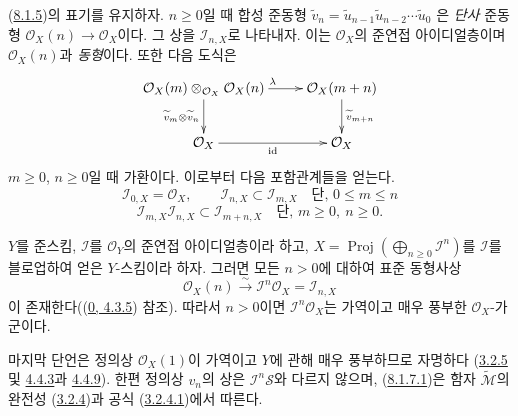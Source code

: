 \begin{env}[8.1.6]
\label{II.8.1.6-ko}
(\hyperref[II.8.1.5-ko]{8.1.5})의 표기를 유지하자. $n\geq0$일 때 합성 준동형
$\widetilde{v}_n=\widetilde{u}_{n-1}\widetilde{u}_{n-2}\cdots\widetilde{u}_0$
은 \emph{단사} 준동형 $\mathcal{O}_X(n)\to\mathcal{O}_X$이다. 그 상을
$\mathcal{I}_{n,X}$로 나타내자. 이는 $\mathcal{O}_X$의 준연접 아이디얼층이며
$\mathcal{O}_X(n)$과 \emph{동형}이다. 또한 다음 도식은
\[
\xymatrix{
  \mathcal{O}_X(m)\otimes_{\mathcal{O}_X}\mathcal{O}_X(n)
    \ar[r]^{\lambda}\ar[d]_{\widetilde{v}_m\otimes\widetilde{v}_n}
  & \mathcal{O}_X(m+n)\ar[d]^{\widetilde{v}_{m+n}}\\
  \mathcal{O}_X\ar[r]_{\mathrm{id}}
  & \mathcal{O}_X
}
\]
$m\geq0$, $n\geq0$일 때 가환이다. 이로부터 다음 포함관계들을 얻는다.
\begin{equation}
\label{II.8.1.6.1-ko}
  \mathcal{I}_{0,X}=\mathcal{O}_X,\qquad
  \mathcal{I}_{n,X}\subset\mathcal{I}_{m,X}
  \quad\text{단, }0\leq m\leq n
\tag{8.1.6.1}
\end{equation}
\begin{equation}
\label{II.8.1.6.2-ko}
  \mathcal{I}_{m,X}\mathcal{I}_{n,X}\subset\mathcal{I}_{m+n,X}
  \quad\text{단, }m\geq0,\ n\geq0.
\tag{8.1.6.2}
\end{equation}
\end{env}


\begin{proposition}[8.1.7]
\label{II.8.1.7-ko}
$Y$를 준스킴, $\mathcal{I}$를 $\mathcal{O}_Y$의 준연접 아이디얼층이라 하고,
$X=\operatorname{Proj}(\bigoplus_{n\geq0}\mathcal{I}^n)$를
$\mathcal{I}$를 블로업하여 얻은 $Y$-스킴이라 하자. 그러면 모든
$n>0$에 대하여 표준 동형사상
\begin{equation}
\label{II.8.1.7.1-ko}
  \mathcal{O}_X(n)\xrightarrow{\sim}\mathcal{I}^n\mathcal{O}_X
  =\mathcal{I}_{n,X}
\tag{8.1.7.1}
\end{equation}
이 존재한다((\hyperref[0.4.3.5-ko]{0, 4.3.5}) 참조). 따라서 $n>0$이면
$\mathcal{I}^n\mathcal{O}_X$는 가역이고 매우 풍부한 $\mathcal{O}_X$-가군이다.
\end{proposition}

마지막 단언은 정의상 $\mathcal{O}_X(1)$이 가역이고 $Y$에 관해 매우
풍부하므로 자명하다
(\hyperref[II.3.2.5-ko]{3.2.5} 및 \hyperref[II.4.4.3-ko]{4.4.3}과
\hyperref[II.4.4.9-ko]{4.4.9}). 한편 정의상 $v_n$의 상은
$\mathcal{I}^n\mathcal{S}$와 다르지 않으며,
(\hyperref[II.8.1.7.1-ko]{8.1.7.1})은 함자
$\widetilde{\mathcal{M}}$의 완전성
(\hyperref[II.3.2.4-ko]{3.2.4})과 공식
(\hyperref[II.3.2.4.1-ko]{3.2.4.1})에서 따른다.

